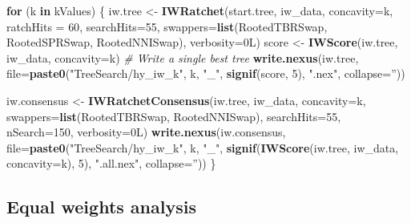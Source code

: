 \documentclass[openany]{book}
\newenvironment{Shaded}{\begin{snugshade}}{\end{snugshade}}
\newcommand{\KeywordTok}[1]{\textcolor[rgb]{0.13,0.29,0.53}{\textbf{#1}}}
\newcommand{\DataTypeTok}[1]{\textcolor[rgb]{0.13,0.29,0.53}{#1}}
\newcommand{\DecValTok}[1]{\textcolor[rgb]{0.00,0.00,0.81}{#1}}
\newcommand{\StringTok}[1]{\textcolor[rgb]{0.31,0.60,0.02}{#1}}
\newcommand{\CommentTok}[1]{\textcolor[rgb]{0.56,0.35,0.01}{\textit{#1}}}
\newcommand{\ControlFlowTok}[1]{\textcolor[rgb]{0.13,0.29,0.53}{\textbf{#1}}}
\newcommand{\NormalTok}[1]{#1}
\theoremstyle{definition}
\theoremstyle{definition}
\theoremstyle{definition}
\theoremstyle{remark}
\begin{document}
\begin{Shaded}
\begin{Highlighting}[]
\ControlFlowTok{for}\NormalTok{ (k }\ControlFlowTok{in}\NormalTok{ kValues) \{}
\NormalTok{  iw.tree <-}\StringTok{ }\KeywordTok{IWRatchet}\NormalTok{(start.tree, iw_data, }\DataTypeTok{concavity=}\NormalTok{k,}
                       \DataTypeTok{ratchHits =} \DecValTok{60}\NormalTok{, }\DataTypeTok{searchHits=}\DecValTok{55}\NormalTok{,}
                       \DataTypeTok{swappers=}\KeywordTok{list}\NormalTok{(RootedTBRSwap, RootedSPRSwap, RootedNNISwap),}
                       \DataTypeTok{verbosity=}\NormalTok{0L)}
\NormalTok{  score <-}\StringTok{ }\KeywordTok{IWScore}\NormalTok{(iw.tree, iw_data, }\DataTypeTok{concavity=}\NormalTok{k)}
  \CommentTok{# Write a single best tree}
  \KeywordTok{write.nexus}\NormalTok{(iw.tree,}
              \DataTypeTok{file=}\KeywordTok{paste0}\NormalTok{(}\StringTok{"TreeSearch/hy_iw_k"}\NormalTok{, k, }\StringTok{"_"}\NormalTok{, }
                          \KeywordTok{signif}\NormalTok{(score, }\DecValTok{5}\NormalTok{), }\StringTok{".nex"}\NormalTok{, }\DataTypeTok{collapse=}\StringTok{''}\NormalTok{))}

\NormalTok{  iw.consensus <-}\StringTok{ }\KeywordTok{IWRatchetConsensus}\NormalTok{(iw.tree, iw_data, }\DataTypeTok{concavity=}\NormalTok{k,}
                  \DataTypeTok{swappers=}\KeywordTok{list}\NormalTok{(RootedTBRSwap, RootedNNISwap),}
                  \DataTypeTok{searchHits=}\DecValTok{55}\NormalTok{,}
                  \DataTypeTok{nSearch=}\DecValTok{150}\NormalTok{, }\DataTypeTok{verbosity=}\NormalTok{0L)}
  \KeywordTok{write.nexus}\NormalTok{(iw.consensus, }
              \DataTypeTok{file=}\KeywordTok{paste0}\NormalTok{(}\StringTok{"TreeSearch/hy_iw_k"}\NormalTok{, k, }\StringTok{"_"}\NormalTok{, }
                          \KeywordTok{signif}\NormalTok{(}\KeywordTok{IWScore}\NormalTok{(iw.tree, iw_data, }\DataTypeTok{concavity=}\NormalTok{k), }\DecValTok{5}\NormalTok{),}
                          \StringTok{".all.nex"}\NormalTok{, }\DataTypeTok{collapse=}\StringTok{''}\NormalTok{))}
\NormalTok{\}}
\end{Highlighting}
\end{Shaded}

\subsection{Equal weights analysis}\label{equal-weights-analysis}
\end{document}
